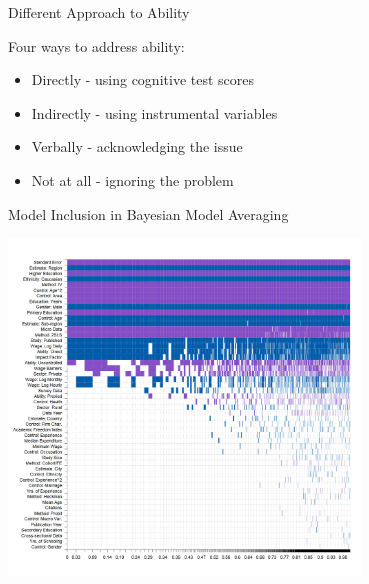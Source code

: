 \documentclass{beamer} %
\begin{document}
\begin{frame}{Different Approach to Ability}

    Four ways to address ability:
    \vspace{0.3cm}

    \begin{itemize}
        \item<1-> Directly - using cognitive test scores
        \item<2-> Indirectly - using instrumental variables
        \item<3-> Verbally - acknowledging the issue
        \item<4-> Not at all - ignoring the problem
    \end{itemize}

\end{frame}


\begin{frame}{Model Inclusion in Bayesian Model Averaging}
    \begin{center}
        \includegraphics[width=0.7\textwidth]{Figures/bma_UIP_dilut_results.png}
    \end{center}
\end{frame}




\end{document}
